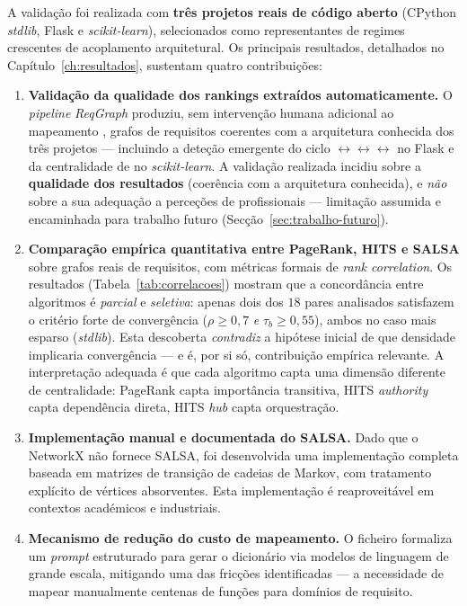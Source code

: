 A validação foi realizada com \textbf{três projetos reais de código
aberto} (CPython \emph{stdlib}, Flask e \emph{scikit-learn}),
selecionados como representantes de regimes crescentes de
acoplamento arquitetural. Os principais resultados, detalhados no
Capítulo~\ref{ch:resultados}, sustentam quatro contribuições:

\begin{enumerate}
    \item \textbf{Validação da qualidade dos rankings extraídos
        automaticamente.} O \emph{pipeline} \emph{ReqGraph} produziu,
        sem intervenção humana adicional ao mapeamento
        , grafos de requisitos coerentes com a
        arquitetura conhecida dos três projetos --- incluindo a
        deteção emergente do ciclo
        $\leftrightarrow$$\leftrightarrow$$\leftrightarrow$
        no Flask e da centralidade de  no
        \emph{scikit-learn}. A validação realizada incidiu sobre a
        \textbf{qualidade dos resultados} (coerência com a
        arquitetura conhecida), e \emph{não} sobre a sua adequação
        a perceções de profissionais --- limitação assumida e
        encaminhada para trabalho futuro
        (Secção~\ref{sec:trabalho-futuro}).

    \item \textbf{Comparação empírica quantitativa entre PageRank,
        HITS e SALSA} sobre grafos reais de requisitos, com
        métricas formais de \emph{rank correlation}. Os resultados
        (Tabela~\ref{tab:correlacoes}) mostram que a concordância
        entre algoritmos é \emph{parcial} e \emph{seletiva}: apenas
        dois dos $18$ pares analisados satisfazem o critério forte
        de convergência ($\rho \geq 0{,}7$ \emph{e} $\tau_b \geq 0{,}55$),
        ambos no caso mais esparso (\emph{stdlib}). Esta
        descoberta \emph{contradiz} a hipótese inicial de que
        densidade implicaria convergência --- e é, por si só,
        contribuição empírica relevante. A interpretação adequada é
        que cada algoritmo capta uma dimensão diferente de
        centralidade: PageRank capta importância transitiva, HITS
        \emph{authority} capta dependência direta, HITS \emph{hub}
        capta orquestração.

    \item \textbf{Implementação manual e documentada do SALSA.}
        Dado que o NetworkX não fornece SALSA, foi desenvolvida uma
        implementação completa baseada em matrizes de transição de
        cadeias de Markov, com tratamento explícito de vértices
        absorventes. Esta implementação é reaproveitável em
        contextos académicos e industriais.

    \item \textbf{Mecanismo de redução do custo de mapeamento.} O
        ficheiro  formaliza um
        \emph{prompt} estruturado para gerar o dicionário
         via modelos de linguagem de grande
        escala, mitigando uma das fricções identificadas --- a
        necessidade de mapear manualmente centenas de funções para
        domínios de requisito.
\end{enumerate}

